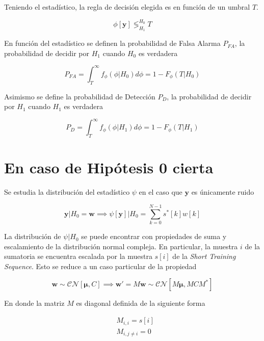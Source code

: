 Teniendo el estadístico, la regla de decisión elegida es en función de un umbral $T$. 

\begin{equation}
    \phi[\mathbf{y}]\mathop{\lessgtr}_{H_1}^{H_0}T
\end{equation}

En función del estadístico se definen la probabilidad de Falsa Alarma $P_{FA}$, la probabilidad de decidir por $H_1$ cuando $H_0$ es verdadera

\begin{equation}
    P_{FA} = \int_T^\infty f_\phi(\phi|H_0)d\phi = 1 - F_\phi(T|H_0)    
\end{equation}

Asimismo se define la probabilidad de Detección $P_D$, la probabilidad de decidir por $H_1$ cuando $H_1$ es verdadera

\begin{equation}
    P_{D} = \int_T^\infty f_\phi(\phi|H_1)d\phi = 1 - F_\phi(T|H_1)
\end{equation}


\section{En caso de Hipótesis 0 cierta}

Se estudia la distribución del estadístico $\psi$ en el caso que $\mathbf{y}$ es únicamente ruido 

\begin{equation}
    \mathbf{y} | H_0 = \mathbf{w} \implies \psi[\mathbf{y}] | H_0= \sum_{k = 0}^{N-1} s^\ast[k]w[k]
\end{equation}

La distribución de $\psi | H_0$ se puede encontrar con propiedades de suma y escalamiento de la distribución normal compleja. En particular, la muestra $i$ de la sumatoria se encuentra escalada por la muestra $s[i]$ de la \textit{Short Training Sequence}. Esto se reduce a un caso particular de la propiedad

\begin{equation}
    \mathbf{w} \sim \mathcal{CN}[\mathbf{\mu}, C] \implies \mathbf{w}' = M \mathbf{w} \sim \mathcal{CN}[M\mathbf{\mu}, MCM^\ast]
\end{equation}

En donde la matriz $M$ es diagonal definida de la siguiente forma

\begin{equation}
    \begin{aligned}
       & M_{i,i} = s[i]\\
       & M_{i,j\ne i} = 0 
    \end{aligned}
\end{equation}

